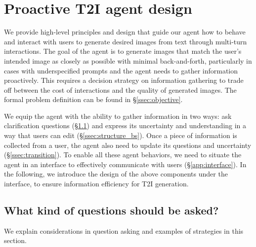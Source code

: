 \section{Proactive T2I agent design}
\label{sec:blueprints}





We provide high-level principles and design that guide our agent how to behave and interact with users to generate desired images from text through multi-turn interactions. The goal of the agent is to generate images that match the user's intended image as closely as possible with minimal back-and-forth, particularly in cases with underspecified prompts and the agent needs to gather information proactively. This requires a decision strategy on information gathering to trade off between the cost of interactions and the quality of generated images. The formal problem definition can be found in \S\ref{ssec:objective}.




We equip the agent with the ability to gather information in two ways: ask clarification questions (\S\ref{ssec:question}) and express its uncertainty and understanding in a way that users can edit (\S\ref{ssec:structure_bs}). Once a piece of information is collected from a user, the agent also need to update its questions and uncertainty (\S\ref{ssec:transition}). To enable all these agent behaviors, we need to situate the agent in an interface to effectively communicate with users (\S\ref{app:interface}). %
In the following, we introduce the design of the above components under the interface, to ensure information efficiency for T2I generation.






\vspace{-.5em}
\subsection{What kind of questions should be asked?}
\label{ssec:question}
\vspace{-.5em}
We explain considerations in question asking and examples of strategies in this section.



\vspace{-.5em}
